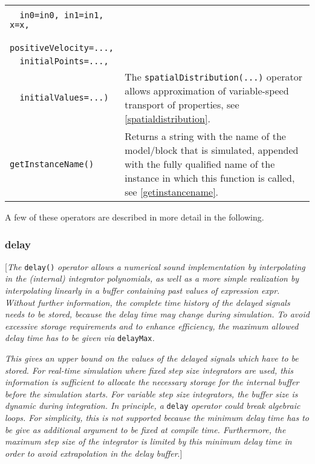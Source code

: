 \begin{longtable}{|p{5.1cm}|p{8cm}|}
\begin{tabular}{@{}p{5.1cm}@{}}
\lstinline!spatialDistribution(!\\
\lstinline!  in0=in0, in1=in1, x=x,!\\
\lstinline!  positiveVelocity=...,!\\
\lstinline!  initialPoints=...,!\\
\lstinline!  initialValues=...)!
\end{tabular} &
The \lstinline!spatialDistribution(...)! operator allows approximation of
variable-speed transport of properties, see \autoref{spatialdistribution}.\\
\hline

\lstinline!getInstanceName()! & Returns a string with the name of the model/block
that is simulated, appended with the fully qualified name of the
instance in which this function is called, see \autoref{getinstancename}.\\
\hline
\end{longtable}

A few of these operators are described in more detail in the following.

\subsubsection{delay}

{[}\emph{The} \lstinline!delay()! \emph{operator allows a numerical sound
implementation by interpolating in the (internal) integrator
polynomials, as well as a more simple realization by interpolating
linearly in a buffer containing past values of expression expr. Without
further information, the complete time history of the delayed signals
needs to be stored, because the delay time may change during simulation.
To avoid excessive storage requirements and to enhance efficiency, the
maximum allowed delay time has to be given via} \lstinline!delayMax!\emph{. }

\emph{This gives an upper bound on the values of the delayed signals
which have to be stored. For real-time simulation where fixed step size
integrators are used, this information is sufficient to allocate the
necessary storage for the internal buffer before the simulation starts.
For variable step size integrators, the buffer size is dynamic during
integration. In principle, a} \lstinline!delay! \emph{operator could break algebraic
loops. For simplicity, this is not supported because the minimum delay
time has to be give as additional argument to be fixed at compile time.
Furthermore, the maximum step size of the integrator is limited by this
minimum delay time in order to avoid extrapolation in the delay
buffer}.{]}

